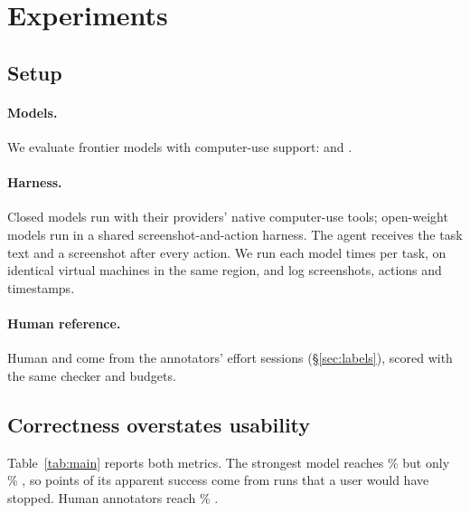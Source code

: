 \section{Experiments}
\label{sec:experiments}

\subsection{Setup}
\label{sec:setup}

\paragraph{Models.} We evaluate  frontier models with computer-use support:  and . 

\paragraph{Harness.} Closed models run with their providers' native computer-use tools; open-weight models run in a shared screenshot-and-action harness. The agent receives the task text and a screenshot after every action. We run each model  times per task, on identical virtual machines in the same region, and log screenshots, actions and timestamps. 

\paragraph{Human reference.} Human \sr and \tsr come from the annotators' effort sessions (\S\ref{sec:labels}), scored with the same checker and budgets.

\subsection{Correctness overstates usability}
\label{sec:main-results}



Table~\ref{tab:main} reports both metrics. The strongest model reaches \% \sr but only \% \tsr, so  points of its apparent success come from runs that a user would have stopped. Human annotators reach \% \tsr. 

